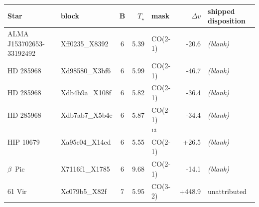 \begin{tabular}{@{}l@{~}l@{~}c@{~}r@{~}l@{~}r@{~~}l@{}}
\hline
Star & block & B & $T_\star$ & mask & $\Delta v$ & shipped disposition \\
\hline
ALMA J153702653-33192492 & Xff0235\_X8392 & 6 & 5.39 & CO(2-1) & -20.6 & \emph{(blank)} \\
HD 285968 & Xd98580\_X3bf6 & 6 & 5.99 & CO(2-1) & -46.7 & \emph{(blank)} \\
HD 285968 & Xdb4b9a\_X108f & 6 & 5.82 & CO(2-1) & -36.4 & \emph{(blank)} \\
HD 285968 & Xdb7ab7\_X5b4e & 6 & 5.87 & CO(2-1) & -34.4 & \emph{(blank)} \\
HIP 10679 & Xa95c04\_X14cd & 6 & 5.55 & $^{13}$CO(2-1) & +26.5 & \emph{(blank)} \\
$\beta$~Pic & X7116f1\_X1785 & 6 & 9.68 & CO(2-1) & -14.1 & \emph{(blank)} \\
61 Vir & Xc079b5\_X82f & 7 & 5.95 & CO(3-2) & +448.9 & unattributed \\
\hline
\end{tabular}
